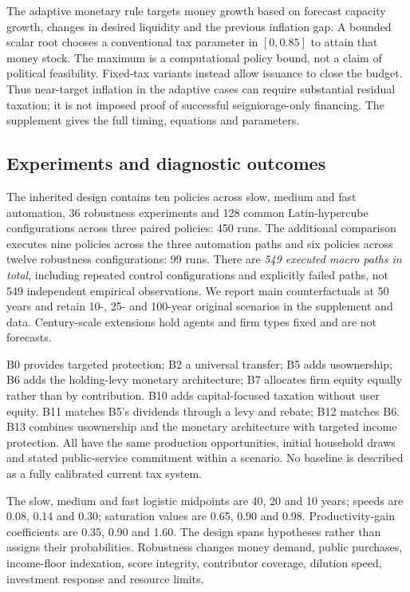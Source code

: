 The adaptive monetary rule targets money growth based on forecast capacity growth, changes in desired liquidity and the previous inflation gap. A bounded scalar root chooses a conventional tax parameter in $[0,0.85]$ to attain that money stock. The maximum is a computational policy bound, not a claim of political feasibility. Fixed-tax variants instead allow issuance to close the budget. Thus near-target inflation in the adaptive cases can require substantial residual taxation; it is not imposed proof of successful seigniorage-only financing. The supplement gives the full timing, equations and parameters.

\subsection{Experiments and diagnostic outcomes}
The inherited design contains ten policies across slow, medium and fast automation, 36 robustness experiments and 128 common Latin-hypercube configurations across three paired policies: 450 runs. The additional comparison executes nine policies across the three automation paths and six policies across twelve robustness configurations: 99 runs. There are \emph{549 executed macro paths in total}, including repeated control configurations and explicitly failed paths, not 549 independent empirical observations. We report main counterfactuals at 50 years and retain 10-, 25- and 100-year original scenarios in the supplement and data. Century-scale extensions hold agents and firm types fixed and are not forecasts.

B0 provides targeted protection; B2 a universal transfer; B5 adds usownership; B6 adds the holding-levy monetary architecture; B7 allocates firm equity equally rather than by contribution. B10 adds capital-focused taxation without user equity. B11 matches B5's dividends through a levy and rebate; B12 matches B6. B13 combines usownership and the monetary architecture with targeted income protection. All have the same production opportunities, initial household draws and stated public-service commitment within a scenario. No baseline is described as a fully calibrated current tax system.

The slow, medium and fast logistic midpoints are 40, 20 and 10 years; speeds are 0.08, 0.14 and 0.30; saturation values are 0.65, 0.90 and 0.98. Productivity-gain coefficients are 0.35, 0.90 and 1.60. The design spans hypotheses rather than assigns their probabilities. Robustness changes money demand, public purchases, income-floor indexation, score integrity, contributor coverage, dilution speed, investment response and resource limits.

